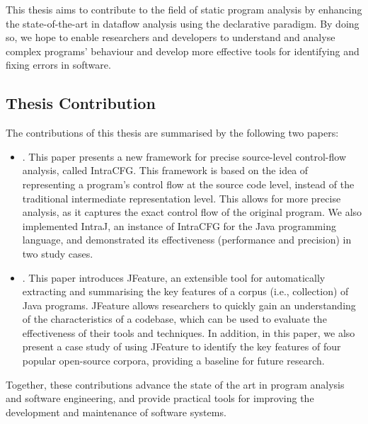 This thesis aims to contribute to the field of static program analysis 
by enhancing the state-of-the-art in dataflow analysis using the declarative paradigm. 
By doing so, we hope to enable researchers and developers to understand and 
analyse complex programs' behaviour and develop more effective tools for 
identifying and fixing errors in software.



\subsection*{Thesis Contribution}

The contributions of this thesis are summarised by the following two papers:

\begin{itemize}
	\item \paperIref.
	This paper presents a new framework for precise source-level control-flow 
	analysis, called IntraCFG. This framework is based on the idea of 
	representing a program's control flow at the source code level, instead of 
	the traditional intermediate representation level. This allows for more 
	precise analysis, as it captures the exact control flow of the original program.
    We also implemented IntraJ, an instance of IntraCFG for the Java programming 
	language, and demonstrated its effectiveness (performance and precision) in 
	two study cases.

	\item \paperIIref.
	This paper introduces JFeature, an extensible tool for automatically extracting and summarising
	the key features of a corpus (i.e., collection) of Java programs. JFeature 
	allows researchers to quickly gain an understanding of the characteristics of a codebase, 
	which can be used to evaluate the effectiveness of their tools and techniques.
	In addition, in this paper, we also present a case study of using JFeature to
	identify the key features of four popular open-source corpora, providing a
	baseline for future research.
\end{itemize}

Together, these contributions advance the state of the art in program analysis and software engineering, and provide practical tools for improving the development and maintenance of software systems.

